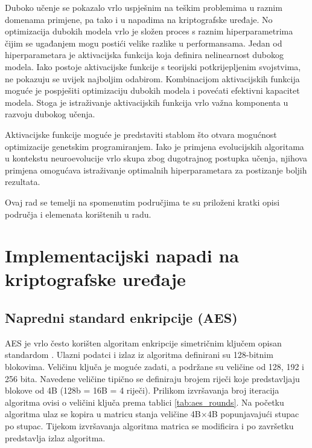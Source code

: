 \documentclass[times, utf8, numeric, diplomski]{fer}
\begin{document}
Duboko učenje se pokazalo vrlo uspješnim na teškim problemima u raznim domenama primjene, pa tako i u napadima na kriptografske uređaje. No optimizacija dubokih modela vrlo je složen proces s raznim hiperparametrima čijim se ugađanjem mogu postići velike razlike u performansama. Jedan od hiperparametara je aktivacijska funkcija koja definira nelinearnost dubokog modela. Iako postoje aktivacijske funkcije s teorijski potkrijepljenim svojstvima, ne pokazuju se uvijek najboljim odabirom. Kombinacijom aktivacijskih funkcija moguće je pospješiti optimizaciju dubokih modela i povećati efektivni kapacitet modela. Stoga je istraživanje aktivacijskih funkcija vrlo važna komponenta u razvoju dubokog učenja.

Aktivacijske funkcije moguće je predstaviti stablom što otvara mogućnost optimizacije genetskim programiranjem. Iako je primjena evolucijskih algoritama u kontekstu neuroevolucije vrlo skupa zbog dugotrajnog postupka učenja, njihova primjena omogućava istraživanje optimalnih hiperparametara za postizanje boljih rezultata.

Ovaj rad se temelji na spomenutim područjima te su priloženi kratki opisi područja i elemenata korištenih u radu.

\chapter{Implementacijski napadi na kriptografske uređaje}

\section{Napredni standard enkripcije (AES)}

AES je vrlo često korišten algoritam enkripcije simetričnim ključem opisan standardom \citep{aes_standard}. Ulazni podatci i izlaz iz algoritma definirani su 128-bitnim blokovima. Veličinu ključa je moguće zadati, a podržane su veličine od 128, 192 i 256 bita. Navedene veličine tipično se definiraju brojem riječi koje predstavljaju blokove od 4B (128b = 16B = 4 riječi). Prilikom izvršavanja broj iteracija algoritma ovisi o veličini ključa prema tablici \ref{tab:aes_rounds}. Na početku algoritma ulaz se kopira u matricu stanja veličine 4B$\times$4B popunjavajući stupac po stupac. Tijekom izvršavanja algoritma matrica se modificira i po završetku predstavlja izlaz algoritma.
\end{document}
